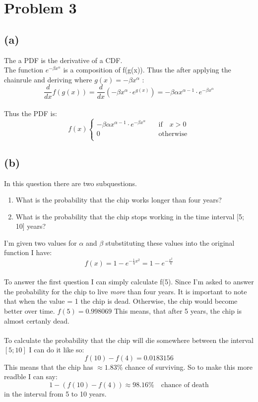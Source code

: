 \section{Problem 3}
\subsection{(a)}
The a PDF is the derivative of a CDF.
\\
The function $e^{- \beta x^{\alpha}}$ is a composition of f(g(x)). 
Thus the after applying the chainrule and deriving where $g(x) = - \beta x^{\alpha} $ :
$$\frac{d}{dx} f(g(x)) = \frac{d}{dx} (- \beta x^{\alpha} \cdot e^{{g(x)}}) = - \beta \alpha x^{\alpha-1} \cdot e^{- \beta x^{\alpha}} $$
\\
Thus the PDF is:
\[f(x) \begin{cases}
    - \beta \alpha x^{\alpha-1} \cdot e^{- \beta x^{\alpha}} & \quad \text{if} \quad x > 0 \\
    0 & \quad \text{otherwise} \\
 \end{cases}
\]

\subsection{(b)}
In this question there are two subquestions.
\begin{enumerate}
    \item What is the probability that the chip works longer than four years?
    \item What is the probability that the chip stops working in the time interval [5;
    10] years?
\end{enumerate}
I'm given two values for $\alpha$ and $\beta$ stubstituting these values into the original
function I have:
$$ f(x) = 1 - e^{-\frac{1}{4}x^2} = 1 - e^{-\frac{x^2}{4}} $$
\\
To answer the first question I can simply calculate f(5). Since I'm asked to answer the probability
for the chip to live \emph{more} than four years. It is important to note that when the value = 1 the
chip is dead. Otherwise, the chip would become better over time.
$f(5) = 0.998069 $ This means, that after 5 years, the chip is almost certanly dead.
\\
\\
To calculate the probability that the chip will die somewhere between the interval $[5;10]$
I can do it like so:
$$f(10)-f(4) = 0.0183156$$ This means that the chip has $\approx 1.83\%$ chance of surviving. So to make this 
more readble I can say:
\\
$$1 - (f(10)-f(4)) \approx 98.16\% \quad \text{chance of death}$$ in the interval from 5 to 10 years.

